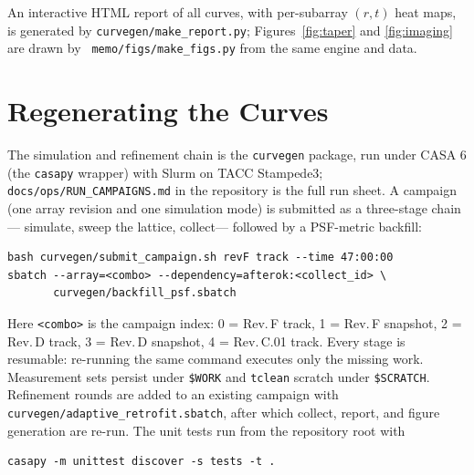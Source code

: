 \documentclass[11pt]{article}
\begin{document}
An interactive HTML report of all curves, with per-subarray
$(r,t)$ heat maps, is generated by {\tt curvegen/make\_report.py};
Figures~\ref{fig:taper} and \ref{fig:imaging} are drawn by {\tt
memo/figs/make\_figs.py} from the same engine and data.

\section{Regenerating the Curves}
\label{sec:regen}

The simulation and refinement chain is the {\tt curvegen} package,
run under CASA 6 (the {\tt casapy} wrapper) with Slurm on TACC
Stampede3; {\tt docs/ops/RUN\_CAMPAIGNS.md} in the repository is the
full run sheet.  A campaign (one array revision and one simulation
mode) is submitted as a three-stage chain--- simulate, sweep the
lattice, collect--- followed by a PSF-metric backfill:
\begin{verbatim}
bash curvegen/submit_campaign.sh revF track --time 47:00:00
sbatch --array=<combo> --dependency=afterok:<collect_id> \
       curvegen/backfill_psf.sbatch
\end{verbatim}
Here {\tt <combo>} is the campaign index: 0 = Rev.\,F track, 1 =
Rev.\,F snapshot, 2 = Rev.\,D track, 3 = Rev.\,D snapshot, 4 =
Rev.\,C.01 track.  Every stage is resumable: re-running the same command executes only
the missing work.  Measurement sets persist under {\tt \$WORK} and
{\tt tclean} scratch under {\tt \$SCRATCH}.  Refinement rounds are
added to an existing campaign with {\tt
curvegen/adaptive\_retrofit.sbatch}, after which collect, report,
and figure generation are re-run.  The unit tests run from the
repository root with
\begin{verbatim}
casapy -m unittest discover -s tests -t .
\end{verbatim}
\end{document}
